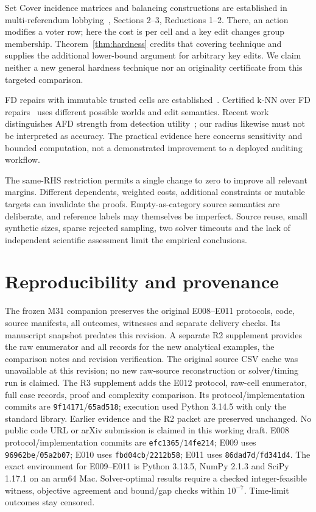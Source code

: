 \documentclass[11pt]{article}
\begin{document}
Set Cover incidence matrices and balancing constructions are established in
multi-referendum lobbying~\cite{lobbying}, Sections 2--3, Reductions 1--2.
There, an action modifies a voter row; here the cost is per cell and a key
edit changes group membership. Theorem~\ref{thm:hardness} credits that covering
technique and supplies the additional lower-bound argument for arbitrary key
edits. We claim neither a new general hardness technique nor an originality
certificate from this targeted comparison.

FD repairs with immutable trusted cells are established~\cite{repairs}.
Certified k-NN over FD repairs~\cite{knn} uses different possible worlds and
edit semantics. Recent work distinguishes AFD strength from detection
utility~\cite{wan}; our radius likewise must not be interpreted as accuracy.
The practical evidence here concerns sensitivity and bounded computation,
not a demonstrated improvement to a deployed auditing workflow.

The same-RHS restriction permits a single change to zero to improve all
relevant margins. Different dependents, weighted costs, additional constraints
or mutable targets can invalidate the proofs. Empty-as-category source semantics
are deliberate, and reference labels may themselves be imperfect. Source reuse,
small synthetic sizes, sparse rejected sampling, two solver timeouts and the
lack of independent scientific assessment limit the empirical conclusions.

\section{Reproducibility and provenance}
The frozen M31 companion preserves the original E008--E011 protocols, code,
source manifests,
all outcomes, witnesses and separate delivery checks. Its manuscript snapshot
predates this revision. A separate R2 supplement provides the raw enumerator
and all records for the new analytical examples, the comparison notes and
revision verification. The original source CSV cache was unavailable at this
revision; no new raw-source reconstruction or solver/timing run is claimed.
The R3 supplement adds the E012 protocol, raw-cell enumerator, full case records,
proof and complexity comparison. Its protocol/implementation commits are
\texttt{9f14171}/\texttt{65ad518}; execution used Python 3.14.5 with only the
standard library. Earlier evidence and the R2 packet are preserved unchanged.
No public code URL or
arXiv submission is claimed in this working draft. E008 protocol/implementation
commits are \texttt{efc1365}/\texttt{14fe214}; E009 uses
\texttt{96962be}/\texttt{05a2b07}; E010 uses
\texttt{fbd04cb}/\texttt{2212b58}; E011 uses
\texttt{86dad7d}/\texttt{fd341d4}. The exact environment for E009--E011 is
Python 3.13.5, NumPy 2.1.3 and SciPy 1.17.1 on an arm64 Mac.
Solver-optimal results require a checked integer-feasible witness, objective
agreement and bound/gap checks within $10^{-7}$. Time-limit outcomes stay censored.
\end{document}
